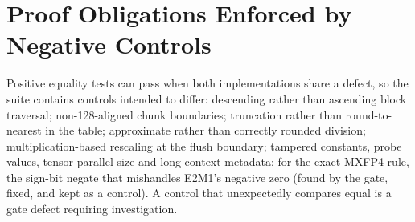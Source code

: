 \documentclass{article}
\begin{document}
\section{Proof Obligations Enforced by Negative Controls}
\label{app:controls}

Positive equality tests can pass when both implementations share a defect, so the suite
contains controls intended to differ: descending rather than ascending block traversal;
non-128-aligned chunk boundaries; truncation rather than round-to-nearest in the table;
approximate rather than correctly rounded division; multiplication-based rescaling at the
flush boundary; tampered constants, probe values, tensor-parallel size and long-context
metadata; for the exact-MXFP4 rule, the sign-bit negate that mishandles E2M1's negative zero
(found by the gate, fixed, and kept as a control).  A control that unexpectedly compares equal
is a gate defect requiring investigation.
\end{document}
